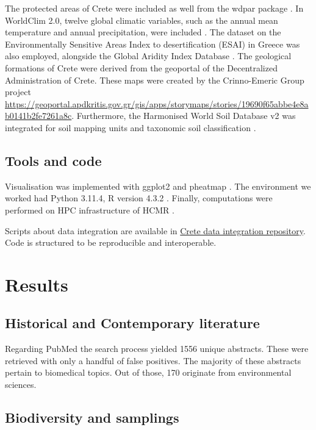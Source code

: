 The protected areas of Crete were included as well from the wdpar package \parencite{Hanson2022}.
In WorldClim 2.0, twelve global climatic variables, such as the annual mean
temperature and annual precipitation, were included \parencite{Fick2017}.
The dataset on the Environmentally Sensitive Areas Index to desertification (ESAI)
in Greece \parencite{KARAMESOUTI2018266} was also employed, alongside the
Global Aridity Index Database \parencite{zomer2022version}.
The geological formations of Crete were derived from the geoportal of the
Decentralized Administration of Crete. These maps were created by the Crinno-Emeric Group
project \url{https://geoportal.apdkritis.gov.gr/gis/apps/storymaps/stories/19690f65abbe4e8ab0141b2fe7261a8c}.
Furthermore, the Harmonised World Soil Database v2 was integrated for soil mapping units and taxonomic soil classification \parencite{fao2023}.

\subsection{Tools and code}\label{Coding environment}
Visualisation was implemented with ggplot2 \parencite{wickham_ggplot2_2016} and pheatmap \parencite{Kolde2019}.
The environment we worked had Python 3.11.4, R version 4.3.2 \parencite{rcoreteam}.
Finally, computations were performed on HPC infrastructure of HCMR \parencite{zafeiropoulos_0s_2021}.

Scripts about data integration are available in
\href{https://github.com/savvas-paragkamian/crete-data-integration}{Crete data integration repository}.
Code is structured to be reproducible and interoperable.

\section{Results}\label{crete_idea_results}

\subsection{Historical and Contemporary literature}

Regarding PubMed the search process yielded 1556 unique abstracts. These were retrieved with only a handful of false positives.
The majority of these abstracts pertain to biomedical topics. Out of those, 170 originate from environmental sciences.

\subsection{Biodiversity and samplings}

